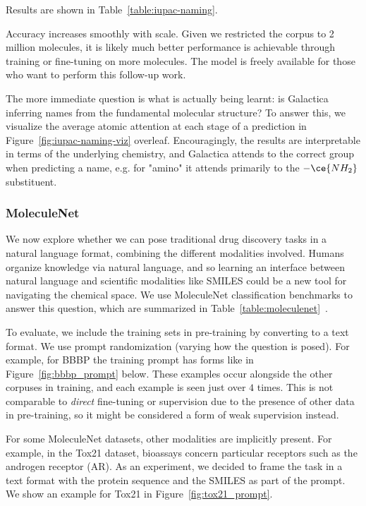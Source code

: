 {Results are shown in Table~\ref{table:iupac-naming}.

Accuracy increases smoothly with scale. Given we restricted the corpus to 2 million molecules, it is likely much better performance is achievable through training or fine-tuning on more molecules. The model is freely available for those who want to perform this follow-up work.

The more immediate question is what is actually being learnt: is Galactica inferring names from the fundamental molecular structure? To answer this, we visualize the average atomic attention at each stage of a prediction in Figure~\ref{fig:iupac-naming-viz} overleaf. Encouragingly, the results are interpretable in terms of the underlying chemistry, and Galactica attends to the correct group when predicting a name, e.g. for "amino" it attends primarily to the $-\ce{NH_{2}}$ substituent.

\subsubsection{MoleculeNet}

We now explore whether we can pose traditional drug discovery tasks in a natural language format, combining the different modalities involved. Humans organize knowledge via natural language, and so learning an interface between natural language and scientific modalities like SMILES could be a new tool for navigating the chemical space. We use MoleculeNet classification benchmarks to answer this question, which are summarized in Table~\ref{table:moleculenet}~\citep{MoleculeNet}.

To evaluate, we include the training sets in pre-training by converting to a text format. We use prompt randomization (varying how the question is posed). For example, for BBBP the training prompt has forms like in Figure~\ref{fig:bbbp_prompt} below. These examples occur alongside the other corpuses in training, and each example is seen just over $4$ times. This is not comparable to \textit{direct} fine-tuning or supervision due to the presence of other data in pre-training, so it might be considered a form of weak supervision instead.

For some MoleculeNet datasets, other modalities are implicitly present. For example, in the Tox21 dataset, bioassays concern particular receptors such as the androgen receptor (AR). As an experiment, we decided to frame the task in a text format with the protein sequence and the SMILES as part of the prompt. We show an example for Tox21 in Figure~\ref{fig:tox21_prompt}.

}
